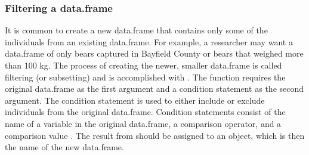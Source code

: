\documentclass[10pt,openany]{book}\usepackage[]{graphicx}\usepackage[]{color}
\begin{document}
\subsubsection{Filtering a data.frame}  \label{sect:RSubsetdf}
\vspace{-12pt}
It is common to create a new data.frame that contains only some of the individuals from an existing data.frame.  For example, a researcher may want a data.frame of only bears captured in Bayfield County or bears that weighed more than 100 kg.  The process of creating the newer, smaller data.frame is called filtering (or subsetting) and is accomplished with .  The  function requires the original data.frame as the first argument and a condition statement as the second argument.  The condition statement is used to either include or exclude individuals from the original data.frame.  Condition statements consist of the name of a variable in the original data.frame, a comparison operator, and a comparison value .  The result from  should be assigned to an object, which is then the name of the new data.frame.

\end{document}
